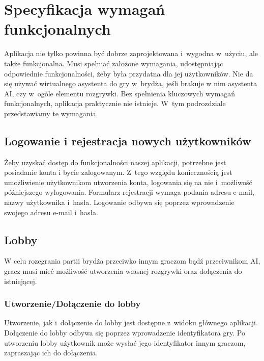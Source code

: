 




\section{Specyfikacja wymagań funkcjonalnych}
Aplikacja nie tylko powinna być dobrze zaprojektowana i~wygodna
w~użyciu, ale także funkcjonalna. Musi spełniać założone wymagania,
udostępniając odpowiednie funkcjonalności, żeby była przydatna dla
jej użytkowników. Nie da się używać wirtualnego asystenta do gry
w~brydża, jeśli brakuje w nim asystenta AI, czy w~ogóle elementu
rozgrywki. Bez spełnienia kluczowych wymagań funkcjonalnych,
aplikacja praktycznie nie istnieje. W~tym podrozdziale przedstawiamy
te wymagania.
\subsection{Logowanie i rejestracja nowych użytkowników}
Żeby uzyskać dostęp do funkcjonalności naszej aplikacji, potrzebne
jest posiadanie konta i bycie zalogowanym. Z~tego względu koniecznością
jest umożliwienie użytkownikom utworzenia konta, logowania się na
nie i~możliwość późniejszego wylogowania. Formularz rejestracji wymaga
podania adresu e-mail, nazwy użytkownika i~hasła. Logowanie odbywa się
poprzez wprowadzenie swojego adresu e-mail i~hasła.
\subsection{Lobby}
W celu rozegrania partii brydża przeciwko innym graczom bądź
przeciwnikom AI, gracz musi mieć możliwość utworzenia własnej
rozgrywki oraz dołączenia do istniejącej.
\subsubsection{Utworzenie/Dołączenie do lobby}
Utworzenie, jak i~dołączenie do lobby jest dostępne z~widoku głównego aplikacji. Dołączenie do lobby
odbywa się poprzez wprowadzenie identyfikatora gry. Po utworzeniu lobby użytkownik może
wysłać jego identyfikator innym graczom, zapraszając ich do dołączenia.
